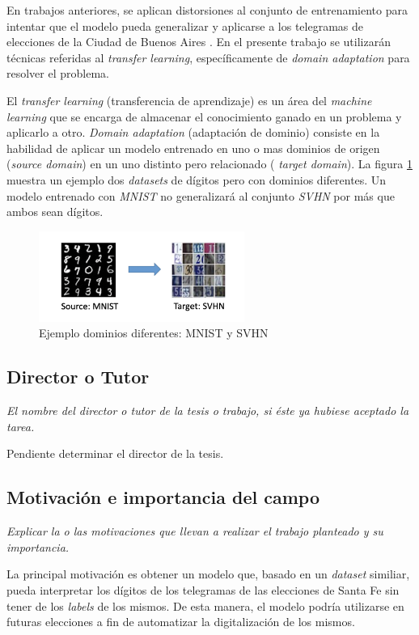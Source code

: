 \documentclass[a4paper, twoside]{report}
\begin{document}
En trabajos anteriores, se aplican distorsiones al conjunto de entrenamiento
para intentar que el modelo pueda generalizar y aplicarse a los telegramas de
elecciones de la Ciudad de Buenos Aires \cite{Lamagna2016}. En el presente
trabajo se utilizar\'an t\'ecnicas referidas al {\it transfer learning},
espec\'ificamente de {\it domain adaptation} para resolver el problema.

El {\it transfer learning} (transferencia de aprendizaje) es un \'area del {\it
		machine learning} que se encarga de almacenar el conocimiento ganado en un
problema y aplicarlo a otro. {\it Domain adaptation} (adaptaci\'on de dominio)
consiste en la habilidad de aplicar un modelo entrenado en uno o mas dominios
de origen ({\it source domain}) en un uno distinto pero relacionado ({\it
		target domain}). La figura \ref{fig:mnist-to-svhn} muestra un ejemplo dos {\it
		datasets} de d\'igitos pero con dominios diferentes. Un modelo entrenado con
	{\it MNIST} no generalizar\'a al conjunto {\it SVHN} por m\'as que ambos sean
d\'igitos.

\begin{figure}[ht]
	\centering
	\includegraphics[width=0.6\textwidth]{mnist-to-svhn.png}
	\caption{Ejemplo dominios diferentes: MNIST y SVHN}
	\label{fig:mnist-to-svhn}
\end{figure}

\subsection*{Director o Tutor}
{\it El nombre del director o tutor de la tesis o trabajo, si éste ya
	hubiese aceptado la tarea.}

Pendiente determinar el director de la tesis.

\subsection*{Motivación e importancia del campo}
{\it Explicar la o las motivaciones que llevan a realizar el trabajo planteado
	y su importancia.}

La principal motivaci\'on es obtener un modelo que, basado en un {\it dataset}
similiar, pueda interpretar los d\'igitos de los telegramas de las elecciones
de Santa Fe sin tener de los {\it labels} de los mismos. De esta manera, el
modelo podr\'ia utilizarse en futuras elecciones a fin de automatizar la
digitalizaci\'on de los mismos.
\end{document}
